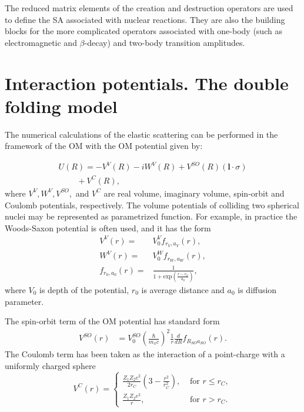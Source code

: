 \documentclass[
12pt, %
oneside, %
english, %
onehalfspacing, %
onehalfspacing, %
headsepline, %
]{MastersDoctoralThesis} %
\begin{document}
The reduced matrix elements of the creation and destruction operators
are used to define the SA associated with nuclear reactions.
They are also the building blocks for the more complicated operators associated with
one-body (such as electromagnetic and $\beta$-decay) and two-body transition amplitudes.

\section{Interaction potentials. The double folding model}

The numerical calculations  of the elastic scattering  can be performed in the framework of the OM with the OM potential given by:

\begin{equation}\label{eqn:OP}
\begin{array}{l}
 U(R)=-V^{V}(R)-iW^{V}(R)+V^{SO}(R)( \mathbf{l} \cdot \sigma )\\
~~~ ~~~~~~~+V^C(R),
\end{array}
\end{equation}
where $V^{V}, W^{V}, V^{SO},$ and $V^C$ are real volume,  imaginary volume, spin-orbit and Coulomb potentials, respectively. The volume potentials of colliding two spherical nuclei may be represented as parametrized function. For example, in practice the Woods-Saxon potential is often used, and it has the form
\begin{align}
V^V\left( r \right) = & V_0^V f_{r_V, a_V} \left( r \right), \nonumber \\
W^V\left( r \right) = & V_0^W f_{r_W, a_W} \left( r \right), \nonumber \\
f_{r_0, a_0} \left( r \right) = &  \frac{1}{1+ \text{exp} \left( \frac{r-r_0}{a_0} \right) },
\end{align}
where $V_0$ is depth of the potential, $r_0$ is  average distance and $a_0$ is  diffusion parameter. 

The spin-orbit term of the OM potential has standard form
\begin{eqnarray}
V^{SO}(r) &= V_0^{SO}\left(\frac{\hbar}{m_\pi c}\right)^2 \frac{1}{r} \frac{d}{dR} f_{R_{SO} a_{SO}}(r).
\end{eqnarray}
The Coulomb term has been taken as the interaction of a point-charge with a uniformly charged sphere
\[
\label{coul}
V^C(r)=
\begin{cases}
\frac{Z_1 Z_2 e^2}{2 r_C} \left( 3- \frac{r^2}{r_C^2} \right), &\text{  for } r \leq r_C, \\
\frac{Z_1 Z_2 e^2}{r}, & \text{ for } r > r_C .
\end{cases}
\]
\end{document}
